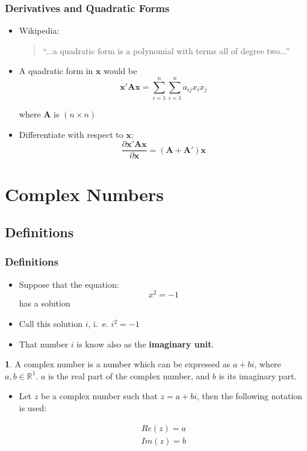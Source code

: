 \documentclass[10pt]{beamer}
\theoremstyle{definition}
\newtheorem{definition}{\translate{Definition}}
\begin{document}
\begin{frame}[fragile]
	\frametitle{Derivatives and Quadratic Forms}
	\begin{itemize}
		\item Wikipedia:
		\begin{quotation}
			``...a quadratic form is a polynomial with terms all of degree two...''
		\end{quotation}
	
		\item A quadratic form in $ \mathbf{x} $ would be
		\[
			\mathbf{x'Ax} = \sum_{i=1}^{n}\sum_{i=1}^{n}a_{ij}x_{i}x_{j}
		\]
		
		where $ \mathbf{A} $ is $ (n\times n) $
		
		\item Differentiate with respect to $ \mathbf{x} $:
		\[
			\dfrac{\partial \mathbf{x'Ax}}{\partial \mathbf{x}} = (\mathbf{A + A'})\mathbf{x}
		\]
	\end{itemize}
\end{frame}

\section{Complex Numbers}
\subsection{Definitions}
\begin{frame}[fragile]
	\frametitle{Definitions}
	\begin{itemize}
		\item Suppose that the equation:
		\[
		x^{2} = -1
		\]
		\noindent has a solution
		\item Call this solution $i$, i.~e. $i^{2} = -1$
		\item That number $i$ is know also as the \textbf{imaginary unit}.
	\end{itemize}
	
	
	\begin{definition}
		A complex number is a number which can be expressed as $a + bi$, where $a,b \in \mathbb{R}^{1}$. $a$ is the real part of the complex number, and $b$ is its imaginary part.
	\end{definition}
	\begin{itemize}
		\item Let $z$ be a complex number such that $z = a + bi$, then the following notation is used:
		
		\[
		\begin{array}{l}
			Re(z) = a\\
			Im(z) = b	
		\end{array}		
		\]
	\end{itemize}
\end{frame}
\end{document}
